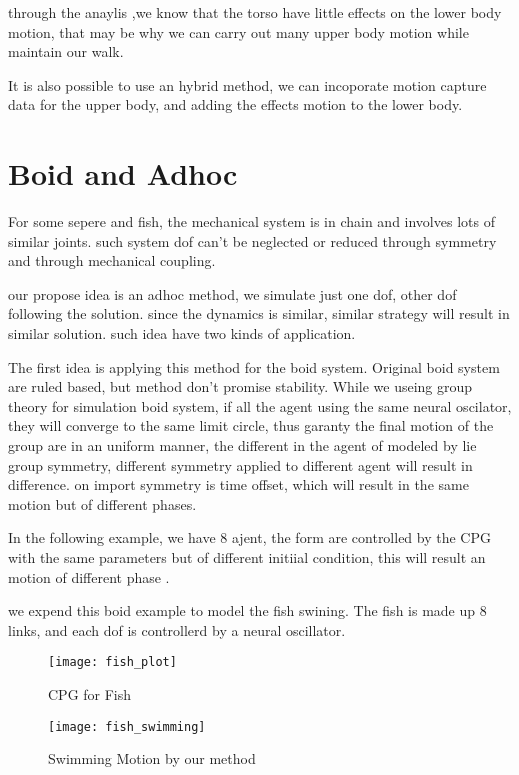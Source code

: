 through the anaylis ,we know that the torso have little effects on the lower body motion,
that may be why we can carry out many upper body motion while maintain our walk.

It is also possible to use an hybrid method,
we can incoporate motion capture data for the upper body, and adding the effects motion to the lower body.


\section{Boid and Adhoc}

For some sepere and fish, the mechanical system is in chain and involves lots of similar joints.
such system dof can't be neglected or reduced through symmetry and through mechanical coupling.

our propose idea is an adhoc method, we simulate just one dof, other dof following the solution.
since the dynamics is similar, similar strategy will result in similar solution.
such idea have two kinds of application.


The first idea is applying this method for the boid system.
Original boid system are ruled based, but method don't promise stability.
While we useing group theory for simulation boid system, if all the agent using the same neural oscilator, they will converge to the same limit circle,
thus garanty the final motion of the group are in an uniform manner, the different in the agent of modeled by lie group symmetry, different symmetry applied to different agent will result in
difference.
on import symmetry is time offset, which will result in the same motion but of different phases.


In the following example, we have 8 ajent,
the form are controlled by the CPG with the same parameters but of different initiial condition,
this will result an motion of different phase .


we expend this boid example to model the fish swining.
The fish is made up 8 links, and each dof is controllerd by a neural oscillator.

\begin{figure}[!htbp]
  \begin{center}
      \texttt{[image: fish\_plot]}
    \caption{CPG for Fish}
    \label{fig:fishplot}
\end{center}
\end{figure}

\begin{figure}[!htbp]
  \begin{center}
      \texttt{[image: fish\_swimming]}
    \caption{Swimming Motion by our method}
    \label{fig:fishswimming}
\end{center}
\end{figure}




